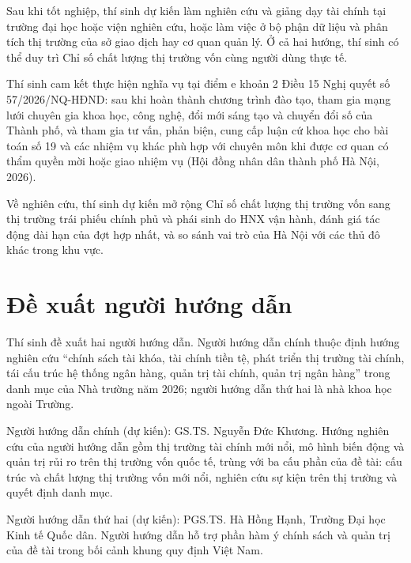 Sau khi tốt nghiệp, thí sinh dự kiến làm nghiên cứu và giảng dạy tài chính tại trường đại học hoặc viện nghiên cứu, hoặc làm việc ở bộ phận dữ liệu và phân tích thị trường của sở giao dịch hay cơ quan quản lý. Ở cả hai hướng, thí sinh có thể duy trì Chỉ số chất lượng thị trường vốn cùng người dùng thực tế.

Thí sinh cam kết thực hiện nghĩa vụ tại điểm e khoản 2 Điều 15 Nghị quyết số 57/2026/NQ-HĐND: sau khi hoàn thành chương trình đào tạo, tham gia mạng lưới chuyên gia khoa học, công nghệ, đổi mới sáng tạo và chuyển đổi số của Thành phố, và tham gia tư vấn, phản biện, cung cấp luận cứ khoa học cho bài toán số 19 và các nhiệm vụ khác phù hợp với chuyên môn khi được cơ quan có thẩm quyền mời hoặc giao nhiệm vụ (Hội đồng nhân dân thành phố Hà Nội, 2026).

Về nghiên cứu, thí sinh dự kiến mở rộng Chỉ số chất lượng thị trường vốn sang thị trường trái phiếu chính phủ và phái sinh do HNX vận hành, đánh giá tác động dài hạn của đợt hợp nhất, và so sánh vai trò của Hà Nội với các thủ đô khác trong khu vực.

\chapter{Đề xuất người hướng dẫn}\label{ch:10}

Thí sinh đề xuất hai người hướng dẫn. Người hướng dẫn chính thuộc định hướng nghiên cứu \enquote{chính sách tài khóa, tài chính tiền tệ, phát triển thị trường tài chính, tái cấu trúc hệ thống ngân hàng, quản trị tài chính, quản trị ngân hàng} trong danh mục của Nhà trường năm 2026; người hướng dẫn thứ hai là nhà khoa học ngoài Trường.

Người hướng dẫn chính (dự kiến): GS.TS. Nguyễn Đức Khương. Hướng nghiên cứu của người hướng dẫn gồm thị trường tài chính mới nổi, mô hình biến động và quản trị rủi ro trên thị trường vốn quốc tế, trùng với ba cấu phần của đề tài: cấu trúc và chất lượng thị trường vốn mới nổi, nghiên cứu sự kiện trên thị trường và quyết định danh mục.

Người hướng dẫn thứ hai (dự kiến): PGS.TS. Hà Hồng Hạnh, Trường Đại học Kinh tế Quốc dân. Người hướng dẫn hỗ trợ phần hàm ý chính sách và quản trị của đề tài trong bối cảnh khung quy định Việt Nam.
